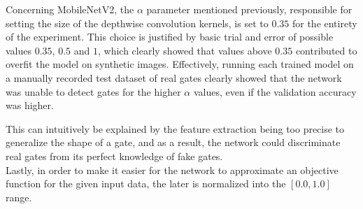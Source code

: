 Concerning MobileNetV2, the $\alpha$ parameter mentioned previously, responsible
for setting the size of the depthwise convolution kernels, is set to $0.35$ for
the entirety of the experiment. This choice is justified by basic trial and
error of possible values $0.35$, $0.5$ and $1$, which clearly showed that
values above $0.35$ contributed to overfit the model on synthetic images.
Effectively, running each trained model on a manually recorded test dataset of
real gates clearly showed that the network was unable to detect gates for the
higher $\alpha$ values, even if the validation accuracy was higher.

This can intuitively be explained by the feature extraction being too precise
to generalize the shape of a gate, and as a result, the network could
discriminate real gates from its perfect knowledge of fake gates.\\

Lastly, in order to make it easier for the network to approximate an objective
function for the given input data, the later is normalized into the $[0.0,1.0]$
range.
